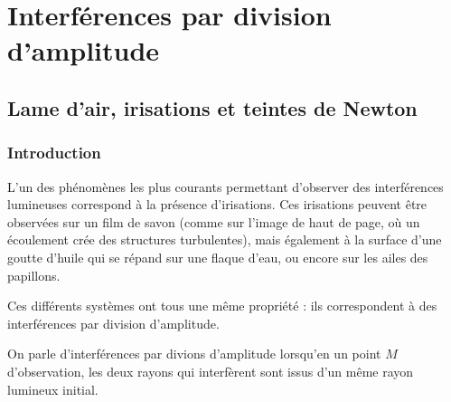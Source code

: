 \documentclass[11pt,fleqn]{book} %
\begin{document}










\setcounter{chapter}{8}

\chapter{Interférences par division d'amplitude}

\section{Lame d'air, irisations et teintes de Newton}

\subsection{Introduction}

L'un des phénomènes les plus courants permettant d'observer des interférences lumineuses correspond à la présence d'irisations. Ces irisations peuvent être observées sur un film de savon (comme sur l'image de haut de page, où un écoulement crée des structures turbulentes), mais également à la surface d'une goutte d'huile qui se répand sur une flaque d'eau, ou encore sur les ailes des papillons.

Ces différents systèmes ont tous une même propriété : ils correspondent à des interférences par division d'amplitude.
\begin{definition}
On parle d'interférences par divions d'amplitude lorsqu'en un point $M$ d'observation, les deux rayons qui interfèrent sont issus d'un même rayon lumineux initial.
\end{definition}
\end{document}
